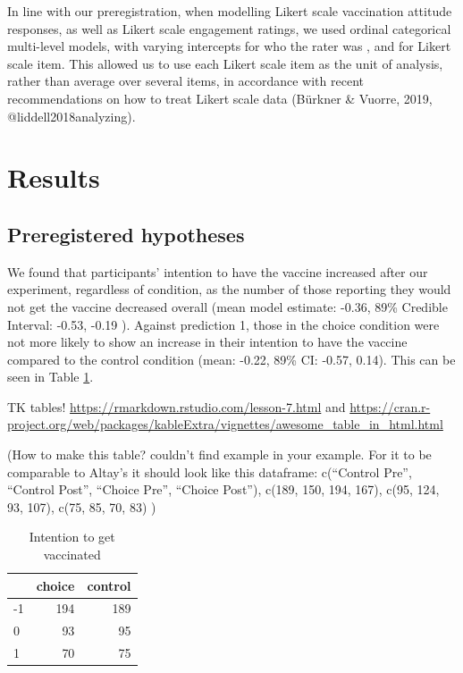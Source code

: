 \documentclass[english,,jou,floatsintext]{apa6}
\begin{document}
In line with our preregistration, when modelling Likert scale vaccination attitude responses, as well as Likert scale engagement ratings, we used ordinal categorical multi-level models, with varying intercepts for who the rater was , and for Likert scale item. This allowed us to use each Likert scale item as the unit of analysis, rather than average over several items, in accordance with recent recommendations on how to treat Likert scale data (Bürkner \& Vuorre, 2019, @liddell2018analyzing).

\hypertarget{results}{%
\section{Results}\label{results}}

\hypertarget{preregistered-hypotheses-1}{%
\subsection{Preregistered hypotheses}\label{preregistered-hypotheses-1}}

We found that participants' intention to have the vaccine increased after our experiment, regardless of condition, as the number of those reporting they would not get the vaccine decreased overall (mean model estimate: -0.36, 89\% Credible Interval: -0.53, -0.19 ). Against prediction 1, those in the choice condition were not more likely to show an increase in their intention to have the vaccine compared to the control condition (mean: -0.22, 89\% CI: -0.57, 0.14). This can be seen in Table \ref{tab:intchange}.

TK tables! \url{https://rmarkdown.rstudio.com/lesson-7.html} and \url{https://cran.r-project.org/web/packages/kableExtra/vignettes/awesome_table_in_html.html}

(How to make this table? couldn't find example in your example. For it to be comparable to Altay's it should look like this dataframe: c(\enquote{Control Pre}, \enquote{Control Post}, \enquote{Choice Pre}, \enquote{Choice Post}), c(189, 150, 194, 167), c(95, 124, 93, 107), c(75, 85, 70, 83) )

\begin{table}

\caption{\label{tab:intchange}Intention to get vaccinated}
\centering
\begin{tabular}[t]{l|r|r}
\hline
  & choice & control\\
\hline
-1 & 194 & 189\\
\hline
0 & 93 & 95\\
\hline
1 & 70 & 75\\
\hline
\end{tabular}
\end{table}
\end{document}
